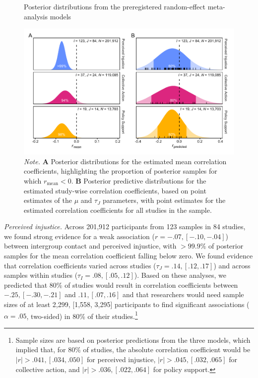 \documentclass[twocolumn, 10pt, letterpaper]{article}
\begin{document}
\begin{figure}
\centering
\caption{Posterior distributions from the preregistered random-effect meta-analysis models}
\includegraphics[scale=1]{../figures/figure-3}
\caption*{\textit{Note.} \textbf{A} Posterior distributions for the estimated mean correlation coefficients, highlighting the proportion of posterior samples for which $r_\text{mean} < 0$. \textbf{B} Posterior predictive distributions for the estimated study-wise correlation coefficients, based on point estimates of the $\mu$ and $\tau_J$ parameters, with point estimates for the estimated correlation coefficients for all studies in the sample.}
\label{fig:f3}
\end{figure}

\emph{Perceived injustice.} Across 201,912 participants from 123 samples
in 84 studies, we found strong evidence for a weak association
(\(r = -.07, [-.10, -.04]\)) between intergroup contact and perceived
injustice, with \(>99.9\%\) of posterior samples for the mean
correlation coefficient falling below zero. We found evidence that
correlation coefficients varied across studies
(\(\tau_J = .14, [.12, .17]\)) and across samples within studies
(\(\tau_I = .08, [.05, .12]\)). Based on these analyses, we predicted
that 80\% of studies would result in correlation coefficients between
\(-.25, [-.30, -.21]\) and \(.11, [.07, .16]\) and that researchers
would need sample sizes of at least 2,299, {[}1,558, 3,295{]}
participants to find significant associations (\(\alpha = .05\),
two-sided) in 80\% of their studies.\footnote{Sample sizes are based on
  posterior predictions from the three models, which implied that, for
  80\% of studies, the absolute correlation coefficient would be
  \(|r| > .041, [.034, .050]\) for perceived injustice,
  \(|r| > .045, [.032, .065]\) for collective action, and
  \(|r| > .036, [.022, .064]\) for policy support.}
\end{document}
